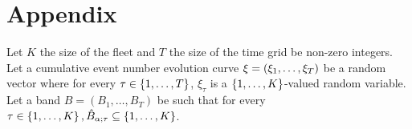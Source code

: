 \documentclass[11pt]{article}
\begin{document}










\section*{Appendix}
\renewcommand{\thesubsection}{\Alph{subsection}}

\begin{definition}
    Let $K$ the size of the fleet and $T$ the size of the time grid be non-zero integers.
    Let a cumulative event number evolution curve $\xi = \left( \xi_1, \ldots, \xi_T \right)$ be a random vector where
    for every  $\tau \in \left\{ 1, \ldots, T \right\}$, $\xi_{\tau}$ is a $\left\{ 1, \ldots, K \right\}$-valued random variable.
    Let a band $B = (B_{1}, \ldots, B_{T})$ be such that for every $\tau \in \left\{ 1, \ldots, K \right\}, \hat{B}_{\alpha; \tau} \subseteq \left\{ 1, \ldots, K \right\}$.
\end{definition}
\end{document}
